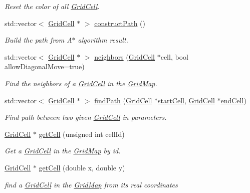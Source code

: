 \begin{DoxyCompactItemize}
\begin{DoxyCompactList}\small\item\em Reset the color of all \hyperlink{classGridCell}{Grid\+Cell}. \end{DoxyCompactList}\item 
std\+::vector$<$ \hyperlink{classGridCell}{Grid\+Cell} $\ast$ $>$ \hyperlink{classGridMap_a9471e8e29679bb4e38f2a3011a394c4d}{construct\+Path} ()
\begin{DoxyCompactList}\small\item\em Build the path from A$\ast$ algorithm result. \end{DoxyCompactList}\item 
std\+::vector$<$ \hyperlink{classGridCell}{Grid\+Cell} $\ast$ $>$ \hyperlink{classGridMap_aecc6cb12f384e8049a4f029a68b11f73}{neighbors} (\hyperlink{classGridCell}{Grid\+Cell} $\ast$cell, bool allow\+Diagonal\+Move=true)
\begin{DoxyCompactList}\small\item\em Find the neighbors of a \hyperlink{classGridCell}{Grid\+Cell} in the \hyperlink{classGridMap}{Grid\+Map}. \end{DoxyCompactList}\item 
std\+::vector$<$ \hyperlink{classGridCell}{Grid\+Cell} $\ast$ $>$ \hyperlink{classGridMap_a976f63082aba927b21bc0d5a83c2261d}{find\+Path} (\hyperlink{classGridCell}{Grid\+Cell} $\ast$\hyperlink{classGridMap_a5c3e52ee3c6cc6183ac94d3cb31d6a93}{start\+Cell}, \hyperlink{classGridCell}{Grid\+Cell} $\ast$\hyperlink{classGridMap_a0ad10e901c423350fd0e578b256bb2f8}{end\+Cell})
\begin{DoxyCompactList}\small\item\em Find path between two given \hyperlink{classGridCell}{Grid\+Cell} in parameters. \end{DoxyCompactList}\item 
\hyperlink{classGridCell}{Grid\+Cell} $\ast$ \hyperlink{classGridMap_a2041007472f0be8fffe93cb1c25d8e9f}{get\+Cell} (unsigned int cell\+Id)
\begin{DoxyCompactList}\small\item\em Get a \hyperlink{classGridCell}{Grid\+Cell} in the \hyperlink{classGridMap}{Grid\+Map} by id. \end{DoxyCompactList}\item 
\hyperlink{classGridCell}{Grid\+Cell} $\ast$ \hyperlink{classGridMap_a5dd1d791747a4580e6c9d73a12b5953f}{get\+Cell} (double x, double y)
\begin{DoxyCompactList}\small\item\em find a \hyperlink{classGridCell}{Grid\+Cell} in the \hyperlink{classGridMap}{Grid\+Map} from its real coordinates \end{DoxyCompactList}\item 

\end{DoxyCompactItemize}
